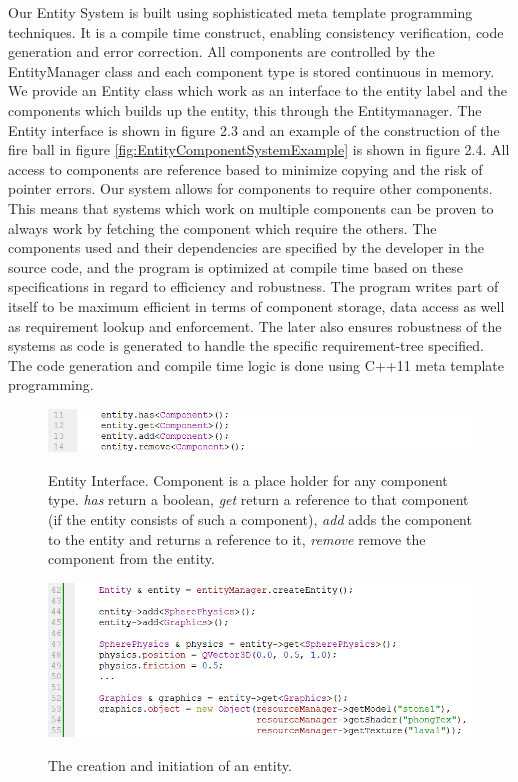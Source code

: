 Our Entity System is built using sophisticated meta template programming techniques. It is a compile time construct, enabling consistency verification, code generation and error correction. All components are controlled by the EntityManager class and each component type is stored continuous in memory. We provide an Entity class which work as an interface to the entity label and the components which builds up the entity, this through the Entitymanager. The Entity interface is shown in figure 2.3 and an example of the construction of the fire ball in figure \ref{fig:EntityComponentSystemExample} is shown in figure 2.4. All access to components are reference based to minimize copying and the risk of pointer errors. Our system allows for components to require other components. This means that systems which work on multiple components can be proven to always work by fetching the component which require the others. The components used and their dependencies are specified by the developer in the source code, and the program is optimized at compile time based on these specifications in regard to efficiency and robustness. The program writes part of itself to be maximum efficient in terms of component storage, data access as well as requirement lookup and enforcement. The later also ensures robustness of the systems as code is generated to handle the specific requirement-tree specified. The code generation and compile time logic is done using C++11 meta template programming.
\begin{figure}[H]
  \centering
  \includegraphics[width=0.9\linewidth]{images/entityInterfaceExample.png}
  \label{fig:EntityInterface}
  \caption{Entity Interface. Component is a place holder for any component type. \textit{has} return a boolean, \textit{get} return a reference to that component (if the entity consists of such a component), \textit{add} adds the component to the entity and returns a reference to it, \textit{remove} remove the component from the entity.}
\end{figure}
\begin{figure}[H]
  \centering
  \includegraphics[width=0.9\linewidth]{images/entityCreationExample.png}
  \label{fig:EntitySetupExample}
  \caption{The creation and initiation of an entity.}
\end{figure}
